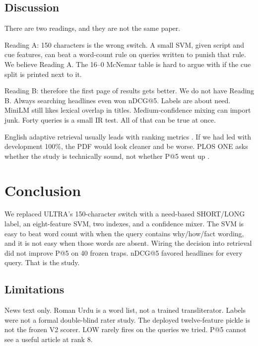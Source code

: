\subsection*{Discussion}
\label{sec:res_discussion}

There are two readings, and they are not the same paper.

Reading A: 150 characters is the wrong switch. A small SVM, given script and cue features, can beat a word-count rule on queries written to punish that rule. We believe Reading A. The 16--0 McNemar table is hard to argue with if the cue split is printed next to it.

Reading B: therefore the first page of results gets better. We do not have Reading B. Always searching headlines even won nDCG@5. Labels are about need. MiniLM still likes lexical overlap in titles. Medium-confidence mixing can import junk. Forty queries is a small IR test. All of that can be true at once.

English adaptive retrieval usually leads with ranking metrics \cite{arabzadeh2021predicting,jeong2024adaptiverag}. If we had led with development 100\%, the PDF would look cleaner and be worse. PLOS ONE asks whether the study is technically sound, not whether P@5 went up \cite{plosone_criteria}.

\section*{Conclusion}
\label{sec:conclusion}

We replaced ULTRA's 150-character switch with a need-based SHORT/LONG label, an eight-feature SVM, two indexes, and a confidence mixer. The SVM is easy to beat word count with when the query contains why/how/fact wording, and it is not easy when those words are absent. Wiring the decision into retrieval did not improve P@5 on 40 frozen traps. nDCG@5 favored headlines for every query. That is the study.

\subsection*{Limitations}
\label{sec:limitations}

News text only. Roman Urdu is a word list, not a trained transliterator. Labels were not a formal double-blind rater study. The deployed twelve-feature pickle is not the frozen V2 scorer. LOW rarely fires on the queries we tried. P@5 cannot see a useful article at rank 8.

